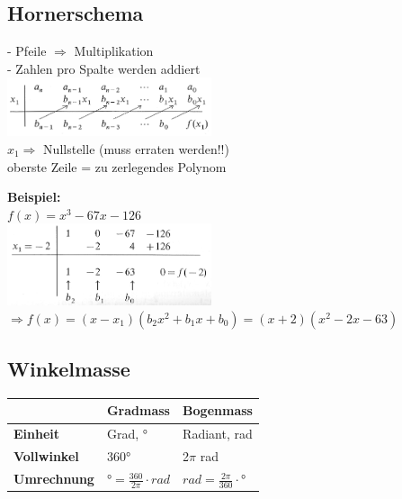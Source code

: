 \subsection{Hornerschema}
\begin{minipage}[t]{9cm}
	- Pfeile $\Rightarrow$ Multiplikation\\
	- Zahlen pro Spalte werden addiert\\
	\includegraphics[width=6cm]{images/hornerschema_1.png}\\
	$x_1 \Rightarrow$ Nullstelle (muss erraten werden!!)\\
	oberste Zeile = zu zerlegendes Polynom			
\end{minipage}
\begin{minipage}[t]{9cm}
	\textbf{Beispiel:}\\
	$f(x) = x^3-67x-126$\\
	\includegraphics[width=6cm]{images/hornerschema_2.png}\\
	$\Rightarrow f(x) = (x-x_1)(b_2x^2 + b_1x + b_0) = (x+2)(x^2-2x-63)$	
\end{minipage}
\subsection{Winkelmasse}
\begin{tabular}{|l|l|l|}
	\hline & \textbf{Gradmass} & \textbf{Bogenmass}\\
	\hline \textbf{Einheit}& Grad, ° & Radiant, rad\\
	\hline \textbf{Vollwinkel}&  360° & 2$\pi$ rad\\
	\hline \textbf{Umrechnung} & $°= \frac{360}{2\pi} \cdot rad$ & $rad= \frac{2\pi}{360} \cdot °$\\
	\hline
\end{tabular}
\newpage